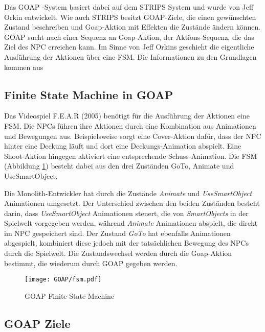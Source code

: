 Das GOAP -System basiert dabei auf dem STRIPS System und wurde von Jeff Orkin entwickelt. Wie auch STRIPS besitzt GOAP-Ziele, die einen gew\"{u}nschten Zustand beschreiben und Goap-Aktion mit Effekten die Zust\"{a}nde \"{a}ndern k\"{o}nnen. GOAP sucht nach einer Sequenz an Goap-Aktion, der Aktions-Sequenz, die das Ziel des NPC erreichen kann. Im Sinne von Jeff Orkins geschieht die eigentliche Ausf\"{u}hrung der Aktionen \"{u}ber eine FSM. Die Informationen zu den Grundlagen kommen aus \autocite{fear, fear2, fear3}


\subsection{Finite State Machine in GOAP}
\label{chap:fsm goap}

Das Videospiel F.E.A.R (2005) ben\"{o}tigt f\"{u}r die Ausf\"{u}hrung der Aktionen eine FSM. Die NPCs f\"{u}hren ihre Aktionen durch eine Kombination aus Animationen und Bewegungen aus. Beispielsweise sorgt eine Cover-Aktion daf\"{u}r, dass der NPC hinter eine Deckung l\"{a}uft und dort eine Deckungs-Animation abspielt. Eine Shoot-Aktion hingegen aktiviert eine entsprechende Schuss-Animation. Die FSM (Abbildung \ref{fig:Goap FSM}) besteht dabei aus den drei Zust\"{a}nden GoTo, Animate und UseSmartObject.

Die Monolith-Entwickler hat durch die Zust\"{a}nde \textit{Animate} und \textit{UseSmartObject} Animationen umgesetzt. Der Unterschied zwischen den beiden Zust\"{a}nden besteht darin, dass \textit{UseSmartObject} Animationen steuert, die von \textit{SmartObjects} in der Spielwelt vorgegeben werden, w\"{a}hrend \textit{Animate} Animationen abspielt, die direkt im NPC gespeichert sind. Der Zustand \textit{GoTo} hat ebenfalls Animationen abgespielt, kombiniert diese jedoch mit der tats\"{a}chlichen Bewegung des NPCs durch die Spielwelt. Die Zustandswechsel werden durch die Goap-Aktion bestimmt, die wiederum durch GOAP gegeben werden.

\begin{figure}[h]
  \centering
  \texttt{[image: GOAP/fsm.pdf]}
	\captionsetup{justification=justified, format=plain}
  \caption{GOAP Finite State Machine}
  \label{fig:Goap FSM}
\end{figure}


\subsection{GOAP Ziele}
\label{chap:goap ziele}

